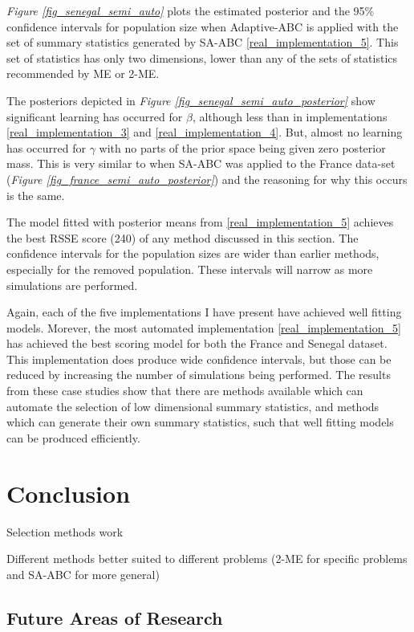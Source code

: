 \documentclass[11pt,a4paper]{article}
\theoremstyle{break}
\begin{document}
  \par \textit{Figure \ref{fig_senegal_semi_auto}} plots the estimated posterior and the 95\% confidence intervals for population size when Adaptive-ABC is applied with the set of summary statistics generated by SA-ABC \ref{real_implementation_5}. This set of statistics has only two dimensions, lower than any of the sets of statistics recommended by ME or 2-ME.

  \par The posteriors depicted in \textit{Figure \ref{fig_senegal_semi_auto_posterior}} show significant learning has occurred for $\beta$, although less than in implementations \ref{real_implementation_3} and \ref{real_implementation_4}. But, almost no learning has occurred for $\gamma$ with no parts of the prior space being given zero posterior mass. This is very similar to when SA-ABC was applied to the France data-set (\textit{Figure \ref{fig_france_semi_auto_posterior}}) and the reasoning for why this occurs is the same.

  \par The model fitted with posterior means from \ref{real_implementation_5} achieves the best RSSE score (240) of any method discussed in this section. The confidence intervals for the population sizes are wider than earlier methods, especially for the removed population. These intervals will narrow as more simulations are performed.

  \par Again, each of the five implementations I have present have achieved well fitting models. Morever, the most automated implementation \ref{real_implementation_5} has achieved the best scoring model for both the France and Senegal dataset. This implementation does produce wide confidence intervals, but those can be reduced by increasing the number of simulations being performed. The results from these case studies show that there are methods available which can automate the selection of low dimensional summary statistics, and methods which can generate their own summary statistics, such that well fitting models can be produced efficiently.

\newpage
\section{Conclusion}

  \par Selection methods work
  \par Different methods better suited to different problems (2-ME for specific problems and SA-ABC for more general)

\subsection{Future Areas of Research}


\newpage
\setcounter{page}{1}


\end{document}
